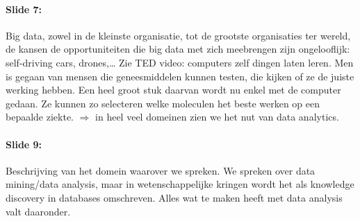 \documentclass[10pt,a4paper]{report}
\begin{document}
\paragraph{Slide 7:}Big data, zowel in de kleinste organisatie, tot de grootste organisaties ter wereld, de kansen de opportuniteiten die big data met zich meebrengen zijn ongelooflijk: self-driving cars, drones,… Zie TED video: computers zelf dingen laten leren. Men is gegaan van mensen die geneesmiddelen kunnen testen, die kijken of ze de juiste werking hebben. Een heel groot stuk daarvan wordt nu enkel met de computer gedaan. Ze kunnen zo selecteren welke moleculen het beste werken op een bepaalde ziekte.
$\Rightarrow$ in heel veel domeinen zien we het nut van data analytics. 

\paragraph{Slide 9:}Beschrijving van het domein waarover we spreken. We spreken over data mining/data analysis, maar in wetenschappelijke kringen wordt het als knowledge discovery in databases omschreven. Alles wat te maken heeft met data analysis valt daaronder.
\end{document}
